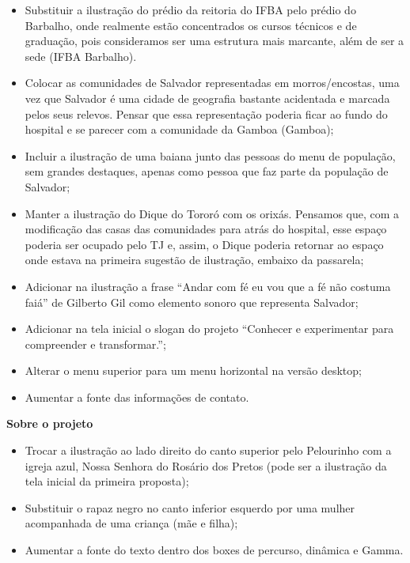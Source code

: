 \documentclass[
]{book}
\providecommand{\tightlist}{%
  \setlength{\itemsep}{0pt}\setlength{\parskip}{0pt}}
\begin{document}
\begin{itemize}
\tightlist
\item
  Substituir a ilustração do prédio da reitoria do IFBA pelo prédio do Barbalho, onde realmente estão concentrados os cursos técnicos e de graduação, pois consideramos ser uma estrutura mais marcante, além de ser a sede (IFBA Barbalho).
\item
  Colocar as comunidades de Salvador representadas em morros/encostas, uma vez que Salvador é uma cidade de geografia bastante acidentada e marcada pelos seus relevos. Pensar que essa representação poderia ficar ao fundo do hospital e se parecer com a comunidade da Gamboa (Gamboa);
\item
  Incluir a ilustração de uma baiana junto das pessoas do menu de população, sem grandes destaques, apenas como pessoa que faz parte da população de Salvador;
\item
  Manter a ilustração do Dique do Tororó com os orixás. Pensamos que, com a modificação das casas das comunidades para atrás do hospital, esse espaço poderia ser ocupado pelo TJ e, assim, o Dique poderia retornar ao espaço onde estava na primeira sugestão de ilustração, embaixo da passarela;
\item
  Adicionar na ilustração a frase ``Andar com fé eu vou que a fé não costuma faiá'' de Gilberto Gil como elemento sonoro que representa Salvador;
\item
  Adicionar na tela inicial o slogan do projeto ``Conhecer e experimentar para compreender e transformar.'';
\item
  Alterar o menu superior para um menu horizontal na versão desktop;
\item
  Aumentar a fonte das informações de contato.
\end{itemize}

\textbf{Sobre o projeto}

\begin{itemize}
\tightlist
\item
  Trocar a ilustração ao lado direito do canto superior pelo Pelourinho com a igreja azul, Nossa Senhora do Rosário dos Pretos (pode ser a ilustração da tela inicial da primeira proposta);
\item
  Substituir o rapaz negro no canto inferior esquerdo por uma mulher acompanhada de uma criança (mãe e filha);
\item
  Aumentar a fonte do texto dentro dos boxes de percurso, dinâmica e Gamma.
\end{itemize}
\end{document}
